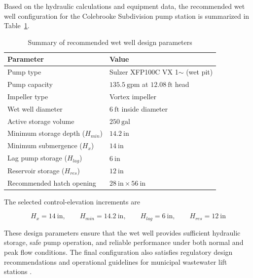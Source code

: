 Based on the hydraulic calculations and equipment data, the recommended wet well configuration for the Colebrooke Subdivision pump station is summarized in Table~\ref{tab:wetwell_summary}.

\begin{table}[H]
\centering
\caption{Summary of recommended wet well design parameters}
\label{tab:wetwell_summary}
\begin{tabular}{ll}
\toprule
\textbf{Parameter} & \textbf{Value} \\
\midrule
Pump type & Sulzer XFP100C VX 1$\sim$ (wet pit) \\
Pump capacity & $135.5~\text{gpm}$ at $12.08~\text{ft}$ head \\
Impeller type & Vortex impeller \\
Wet well diameter & $6~\text{ft}$ inside diameter \\
Active storage volume & $250~\text{gal}$ \\
Minimum storage depth ($H_{min}$) & $14.2~\text{in}$ \\
Minimum submergence ($H_x$) & $14~\text{in}$ \\
Lag pump storage ($H_{lag}$) & $6~\text{in}$ \\
Reservoir storage ($H_{res}$) & $12~\text{in}$ \\
Recommended hatch opening & $28~\text{in} \times 56~\text{in}$ \\
\bottomrule
\end{tabular}
\end{table}

The selected control-elevation increments are

\[
H_x = 14~\text{in}, \qquad
H_{min} = 14.2~\text{in}, \qquad
H_{lag} = 6~\text{in}, \qquad
H_{res} = 12~\text{in}
\]

These design parameters ensure that the wet well provides sufficient hydraulic storage, safe pump operation, and reliable performance under both normal and peak flow conditions. The final configuration also satisfies regulatory design recommendations and operational guidelines for municipal wastewater lift stations \cite{MDEQ_DesignGuidance_2025,TenStates_RecommendedStandards_2014}.
